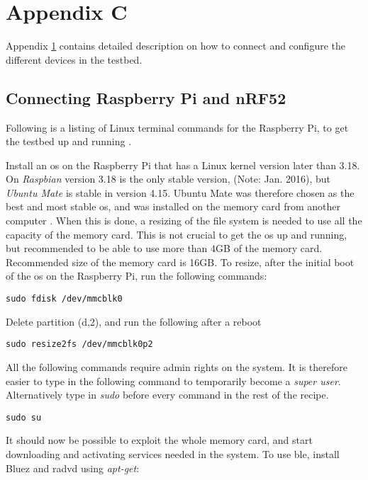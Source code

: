 \chapter{Appendix C}
\label{chp:appendixb1}

Appendix \ref{chp:appendixb1} contains detailed description on how to connect and configure the different devices in the testbed. 

\section{Connecting Raspberry Pi and nRF52}

\noindent Following is a listing of Linux terminal commands for the \gls{Raspberry Pi}, to get the testbed up and running \cite{nordicNrfDocumentation}. 

\noindent Install an \gls{os} on the Raspberry Pi that has a Linux kernel version later than 3.18. On \textit{Raspbian} version 3.18 is the only stable version, (Note: Jan. 2016), but \textit{Ubuntu Mate} is stable in version 4.15. Ubuntu Mate was therefore chosen as the best and most stable \gls{os}, and was installed on the memory card from another computer \cite{ubuntuMate}. When this is done, a resizing of the file system is needed to use all the capacity of the memory card. This is not crucial to get the \gls{os} up and running, but recommended to be able to use more than 4GB of the memory card. Recommended size of the memory card is 16GB. To resize, after the initial boot of the \gls{os} on the \gls{Raspberry Pi}, run the following commands: 

\begin{verbatim}
sudo fdisk /dev/mmcblk0
\end{verbatim}

\noindent Delete partition (d,2), and run the following after a reboot

\begin{verbatim}
sudo resize2fs /dev/mmcblk0p2
\end{verbatim}

\noindent All the following commands require admin rights on the system. It is therefore easier to type in the following command to temporarily become a \textit{super user}. Alternatively type in \textit{sudo} before every command in the rest of the recipe.

\begin{verbatim}
sudo su
\end{verbatim} 

\noindent It should now be possible to exploit the whole memory card, and start downloading and activating services needed in the system. To use \gls{ble}, install Bluez and radvd using \textit{apt-get}:

